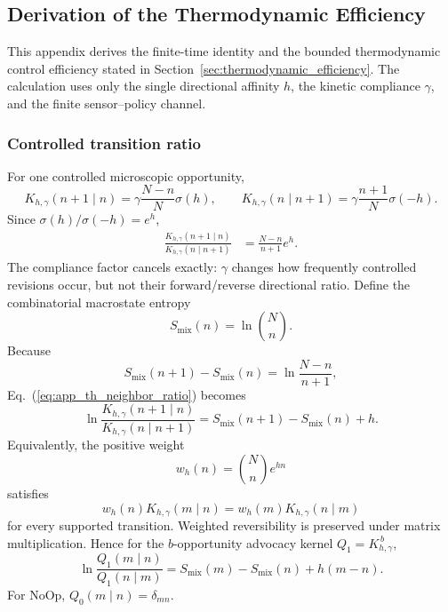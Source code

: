 \subsection{Derivation of the Thermodynamic Efficiency}
\label{app:thermodynamic_efficiency_derivation}

This appendix derives the finite-time identity and the bounded thermodynamic
control efficiency stated in Section~\ref{sec:thermodynamic_efficiency}. The
calculation uses only the single directional affinity $h$, the kinetic
compliance $\gamma$, and the finite sensor--policy channel.

\subsubsection{Controlled transition ratio}

For one controlled microscopic opportunity,
\[
K_{h,\gamma}(n+1\mid n)
=\gamma\frac{N-n}{N}\sigma(h),
\qquad
K_{h,\gamma}(n\mid n+1)
=\gamma\frac{n+1}{N}\sigma(-h).
\]
Since $\sigma(h)/\sigma(-h)=e^h$,
\begin{align}
\frac{K_{h,\gamma}(n+1\mid n)}{K_{h,\gamma}(n\mid n+1)}
&=\frac{N-n}{n+1}e^h. 
\label{eq:app_th_neighbor_ratio}
\end{align}
The compliance factor cancels exactly: $\gamma$ changes how frequently
controlled revisions occur, but not their forward/reverse directional ratio.
Define the combinatorial macrostate entropy
\begin{equation}
S_{\mathrm{mix}}(n)=\ln\binom{N}{n}.
\label{eq:app_th_mixing_entropy}
\end{equation}
Because
\[
S_{\mathrm{mix}}(n+1)-S_{\mathrm{mix}}(n)
=\ln\frac{N-n}{n+1},
\]
Eq.~(\ref{eq:app_th_neighbor_ratio}) becomes
\begin{equation}
\ln\frac{K_{h,\gamma}(n+1\mid n)}{K_{h,\gamma}(n\mid n+1)}
=
S_{\mathrm{mix}}(n+1)-S_{\mathrm{mix}}(n)+h.
\label{eq:app_th_local_ratio}
\end{equation}
Equivalently, the positive weight
\begin{equation}
w_h(n)=\binom{N}{n}e^{hn}
\label{eq:app_th_weight}
\end{equation}
satisfies
\begin{equation}
w_h(n)K_{h,\gamma}(m\mid n)
=w_h(m)K_{h,\gamma}(n\mid m)
\label{eq:app_th_weighted_reversibility}
\end{equation}
for every supported transition. Weighted reversibility is preserved under
matrix multiplication. Hence for the $b$-opportunity advocacy kernel
$Q_1=K_{h,\gamma}^{\,b}$,
\begin{equation}
\boxed{
\ln\frac{Q_1(m\mid n)}{Q_1(n\mid m)}
=
S_{\mathrm{mix}}(m)-S_{\mathrm{mix}}(n)+h(m-n).}
\label{eq:app_th_endpoint_ratio}
\end{equation}
For NoOp, $Q_0(m\mid n)=\delta_{mn}$.

